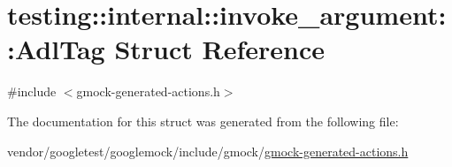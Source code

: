 \hypertarget{structtesting_1_1internal_1_1invoke__argument_1_1AdlTag}{}\section{testing\+:\+:internal\+:\+:invoke\+\_\+argument\+:\+:Adl\+Tag Struct Reference}
\label{structtesting_1_1internal_1_1invoke__argument_1_1AdlTag}


{\ttfamily \#include $<$gmock-\/generated-\/actions.\+h$>$}



The documentation for this struct was generated from the following file\+:\begin{DoxyCompactItemize}
\item 
vendor/googletest/googlemock/include/gmock/\hyperlink{gmock-generated-actions_8h}{gmock-\/generated-\/actions.\+h}\end{DoxyCompactItemize}
